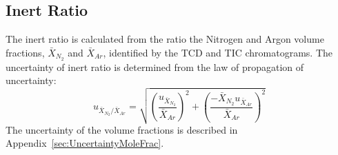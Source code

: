 \documentclass[12pt]{article}
\begin{document}
\subsection{Inert Ratio}
\label{ssec:Inert_ratio}
The inert ratio is calculated from the ratio the Nitrogen and Argon volume fractions, $\bar{X}_{N_2}$ and $\bar{X}_{Ar}$, identified by the TCD and TIC chromatograms. The uncertainty of inert ratio is determined from the law of propagation of uncertainty:
\begin{equation}
\label{eq:inert_ratio_uncertainty}
u_{\scriptscriptstyle \bar{X}_{N_2}/\bar{X}_{Ar}} = \sqrt{{\left(\frac{u_{\scriptscriptstyle \bar{X}_{N_2}}}{\bar{X}_{Ar}}\right)}^2+{\left(\frac{-\bar{X}_{N_2}u_{\scriptscriptstyle \bar{X}_{Ar}}}{\bar{X}_{Ar}}\right)}^2}
\end{equation}
The uncertainty of the volume fractions is described in Appendix~\ref{sec:UncertaintyMoleFrac}.

\pagebreak
\end{document}
